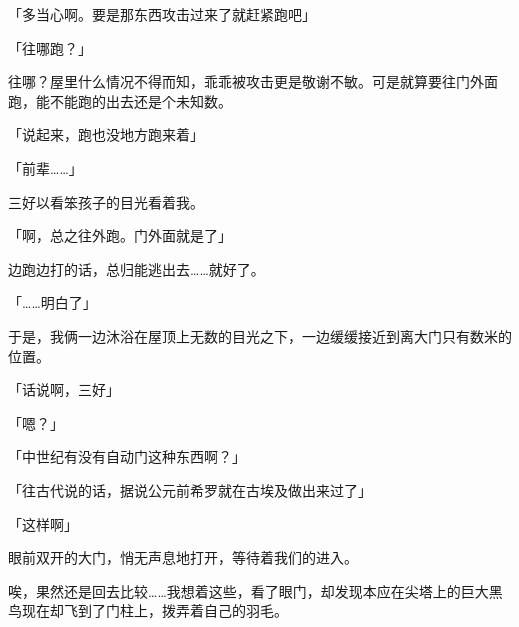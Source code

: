 「多当心啊。要是那东西攻击过来了就赶紧跑吧」

「往哪跑？」

往哪？屋里什么情况不得而知，乖乖被攻击更是敬谢不敏。可是就算要往门外面跑，能不能跑的出去还是个未知数。

「说起来，跑也没地方跑来着」

「前辈……」

三好以看笨孩子的目光看着我。

「啊，总之往外跑。门外面就是了」

边跑边打的话，总归能逃出去……就好了。

「……明白了」

于是，我俩一边沐浴在屋顶上无数的目光之下，一边缓缓接近到离大门只有数米的位置。

「话说啊，三好」

「嗯？」

「中世纪有没有自动门这种东西啊？」

「往古代说的话，据说公元前希罗就在古埃及做出来过了」

「这样啊」

眼前双开的大门，悄无声息地打开，等待着我们的进入。

唉，果然还是回去比较……我想着这些，看了眼门，却发现本应在尖塔上的巨大黑鸟现在却飞到了门柱上，拨弄着自己的羽毛。

